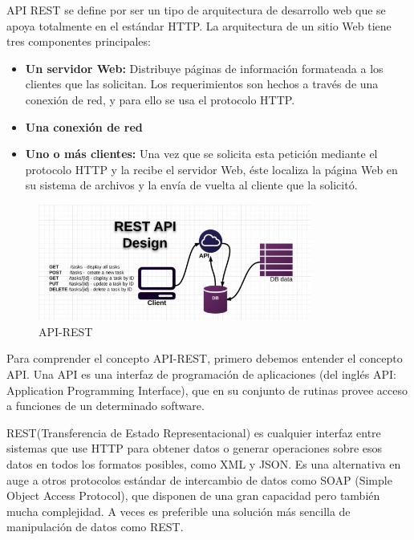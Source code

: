 API REST se define por ser un tipo de arquitectura de desarrollo web que se apoya totalmente en el estándar HTTP.
La arquitectura de un sitio Web tiene tres componentes principales:
\begin{itemize}
    \item \textbf {Un servidor Web:} Distribuye páginas de información formateada a los clientes que las solicitan. Los requerimientos son hechos a través de una conexión de red, y para ello se usa el protocolo HTTP.
    \item \textbf {Una conexión de red}
    \item \textbf {Uno o más clientes:} Una vez que se solicita esta petición mediante el protocolo HTTP y la recibe el servidor Web, éste localiza la página Web en su sistema de archivos y la envía de vuelta al cliente que la solicitó.
\end{itemize}
\begin{figure}[H]
\centering
\includegraphics[width=90mm]{memoria/LaTeX/img/introduccion/rest-api.jpg}
\caption{API-REST}
\end{figure}

Para comprender el concepto API-REST, primero debemos entender el concepto API. Una API es una interfaz de programación de aplicaciones (del inglés API: Application Programming Interface), que en su conjunto de rutinas provee acceso a funciones de un determinado software.

REST(Transferencia de Estado Representacional) es cualquier interfaz entre sistemas que use HTTP para obtener datos o generar operaciones sobre esos datos en todos los formatos posibles, como XML y JSON. Es una alternativa en auge a otros protocolos estándar de intercambio de datos como SOAP (Simple Object Access Protocol), que disponen de una gran capacidad pero también mucha complejidad. A veces es preferible una solución más sencilla de manipulación de datos como REST.

